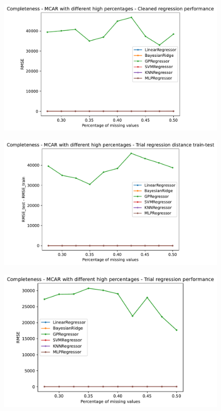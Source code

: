 \documentclass{Configuration_Files/PoliMi3i_thesis}
\begin{document}
\begin{figure}[H]
    \centering
    \includegraphics[scale=0.6]{Images/completeness/15.pdf}     
\end{figure}
\begin{figure}[H]
    \centering
    \includegraphics[scale=0.6]{Images/completeness/16.pdf}   
\end{figure}
\begin{figure}[H]
    \centering
    \includegraphics[scale=0.6]{Images/completeness/17.pdf}
\end{figure}
\end{document}
